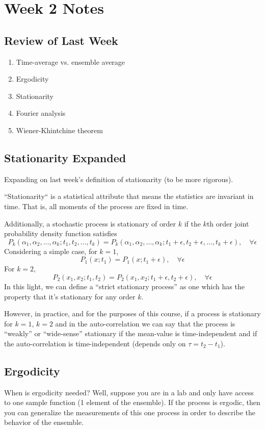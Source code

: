 \documentclass{article}
\begin{document}
\section{Week 2 Notes}
\subsection{Review of Last Week}
\begin{enumerate}
   \item Time-average vs. ensemble average
   \item Ergodicity
   \item Stationarity
   \item Fourier analysis
   \item Wiener-Khintchine theorem
\end{enumerate}

\subsection{Stationarity Expanded}
Expanding on last week's definition of stationarity (to be more rigorous).

``Stationarity`` is a statistical attribute that means the
statistics are invariant in time. That is, all moments of the process are fixed
in time.

Additionally, a stochastic process is stationary of order $ k $ if the $ k $th
order joint probability density function satisfies
\[
   P_{k}(\alpha_{1},\alpha_{2},\ldots,\alpha_{k};t_{1},t_{2},\ldots,t_{k}) =
   P_{k}(\alpha_{1},\alpha_{2},\ldots,\alpha_{k};t_{1}+\epsilon,t_{2}+\epsilon,\ldots,t_{k}+\epsilon),\quad
   \forall \epsilon
\]
Considering a simple case, for $ k=1 $,
\[
   P_{1}(x;t_{1}) = P_{1}(x;t_{1}+\epsilon),\quad \forall \epsilon
\]
For $ k=2 $,
\[
   P_{2}(x_{1},x_{2};t_{1},t_{2}) =
   P_{2}(x_{1},x_{2};t_{1}+\epsilon,t_{2}+\epsilon)
   ,\quad \forall \epsilon
\]
In this light, we can define a ``strict stationary process'' as one which has
the property that it's stationary for any order $ k $.

However, in practice, and for the purposes of this course, if a process is
stationary for $ k=1 $, $ k=2 $ and in the auto-correlation we can say that the
process is ``weakly'' or ``wide-sense'' stationary if the mean-value is
time-independent and if the auto-correlation is time-independent (depends only
on $ \tau = t_{2}-t_{1}$).

\subsection{Ergodicity}
When is ergodicity needed? Well, suppose you are in a lab and only have access
to one sample function (1 element of the ensemble). If the process is ergodic,
then you can generalize the measurements of this one process in order to
describe the behavior of the ensemble.
\end{document}

